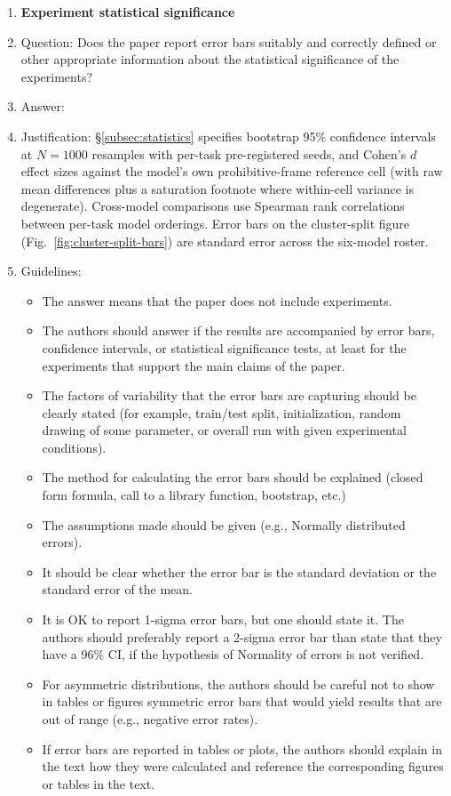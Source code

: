 \documentclass{article}
\begin{document}
\begin{enumerate}
\item {\bf Experiment statistical significance}
    \item[] Question: Does the paper report error bars suitably and correctly defined or other appropriate information about the statistical significance of the experiments?
    \item[] Answer: \answerYes{} %
    \item[] Justification: \S\ref{subsec:statistics} specifies bootstrap 95\% confidence intervals at $N=1000$ resamples with per-task pre-registered seeds, and Cohen's $d$ effect sizes against the model's own prohibitive-frame reference cell (with raw mean differences plus a saturation footnote where within-cell variance is degenerate). Cross-model comparisons use Spearman rank correlations between per-task model orderings. Error bars on the cluster-split figure (Fig.~\ref{fig:cluster-split-bars}) are standard error across the six-model roster.
    \item[] Guidelines:
    \begin{itemize}
        \item The answer \answerNA{} means that the paper does not include experiments.
        \item The authors should answer \answerYes{} if the results are accompanied by error bars, confidence intervals, or statistical significance tests, at least for the experiments that support the main claims of the paper.
        \item The factors of variability that the error bars are capturing should be clearly stated (for example, train/test split, initialization, random drawing of some parameter, or overall run with given experimental conditions).
        \item The method for calculating the error bars should be explained (closed form formula, call to a library function, bootstrap, etc.)
        \item The assumptions made should be given (e.g., Normally distributed errors).
        \item It should be clear whether the error bar is the standard deviation or the standard error of the mean.
        \item It is OK to report 1-sigma error bars, but one should state it. The authors should preferably report a 2-sigma error bar than state that they have a 96\% CI, if the hypothesis of Normality of errors is not verified.
        \item For asymmetric distributions, the authors should be careful not to show in tables or figures symmetric error bars that would yield results that are out of range (e.g., negative error rates).
        \item If error bars are reported in tables or plots, the authors should explain in the text how they were calculated and reference the corresponding figures or tables in the text.
    \end{itemize}


\end{enumerate}
\end{document}
